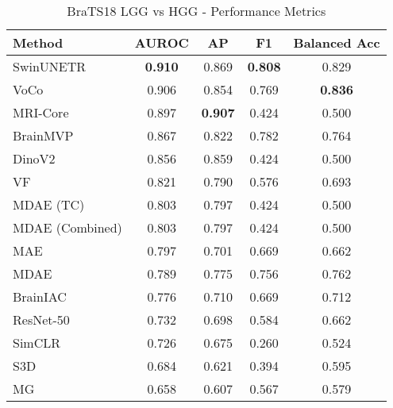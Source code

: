 \begin{table}[ht]
\centering
\caption{BraTS18 LGG vs HGG - Performance Metrics}
\label{tab:brats18_lgg_vs_hgg}
\begin{tabular}{lcccc}
\toprule
Method & AUROC & AP & F1 & Balanced Acc \\
\midrule
SwinUNETR & \textbf{0.910} & 0.869 & \textbf{0.808} & 0.829 \\
VoCo & 0.906 & 0.854 & 0.769 & \textbf{0.836} \\
MRI-Core & 0.897 & \textbf{0.907} & 0.424 & 0.500 \\
BrainMVP & 0.867 & 0.822 & 0.782 & 0.764 \\
DinoV2 & 0.856 & 0.859 & 0.424 & 0.500 \\
VF & 0.821 & 0.790 & 0.576 & 0.693 \\
MDAE (TC) & 0.803 & 0.797 & 0.424 & 0.500 \\
MDAE (Combined) & 0.803 & 0.797 & 0.424 & 0.500 \\
MAE & 0.797 & 0.701 & 0.669 & 0.662 \\
MDAE & 0.789 & 0.775 & 0.756 & 0.762 \\
BrainIAC & 0.776 & 0.710 & 0.669 & 0.712 \\
ResNet-50 & 0.732 & 0.698 & 0.584 & 0.662 \\
SimCLR & 0.726 & 0.675 & 0.260 & 0.524 \\
S3D & 0.684 & 0.621 & 0.394 & 0.595 \\
MG & 0.658 & 0.607 & 0.567 & 0.579 \\
\bottomrule
\end{tabular}
\end{table}
